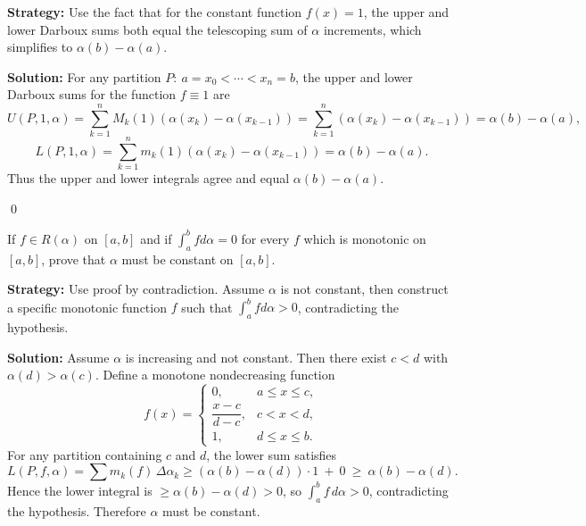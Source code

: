 \noindent\textbf{Strategy:} Use the fact that for the constant function $f(x) = 1$, the upper and lower Darboux sums both equal the telescoping sum of $\alpha$ increments, which simplifies to $\alpha(b) - \alpha(a)$.

\bigskip\noindent\textbf{Solution:}
For any partition $P:\ a=x_0<\cdots<x_n=b$, the upper and lower Darboux sums for the function $f\equiv 1$ are
\[U(P,1,\alpha)=\sum_{k=1}^n M_k(1)(\alpha(x_k)-\alpha(x_{k-1}))=\sum_{k=1}^n (\alpha(x_k)-\alpha(x_{k-1}))=\alpha(b)-\alpha(a),\]
\[L(P,1,\alpha)=\sum_{k=1}^n m_k(1)(\alpha(x_k)-\alpha(x_{k-1}))=\alpha(b)-\alpha(a).\]
Thus the upper and lower integrals agree and equal $\alpha(b)-\alpha(a)$.




\qed
\begin{problembox}
\begin{problemstatement}
If $f \in R(\alpha)$ on $[a, b]$ and if $\int_a^b f d\alpha = 0$ for every $f$ which is monotonic on $[a, b]$, prove that $\alpha$ must be constant on $[a, b]$.
\end{problemstatement}
\end{problembox}

\noindent\textbf{Strategy:} Use proof by contradiction. Assume $\alpha$ is not constant, then construct a specific monotonic function $f$ such that $\int_a^b f d\alpha > 0$, contradicting the hypothesis.

\bigskip\noindent\textbf{Solution:}
Assume $\alpha$ is increasing and not constant. Then there exist $c<d$ with $\alpha(d)>\alpha(c)$. Define a monotone nondecreasing function
\[
f(x)=\begin{cases}
0,& a\le x\le c,\\
\dfrac{x-c}{d-c},& c<x<d,\\
1,& d\le x\le b.
\end{cases}
\]
For any partition containing $c$ and $d$, the lower sum satisfies
\[L(P,f,\alpha)=\sum m_k(f)\,\Delta\alpha_k\ge (\alpha(b)-\alpha(d))\cdot 1\ +\ 0\ \ge\ \alpha(b)-\alpha(d).
\]
Hence the lower integral is $\ge \alpha(b)-\alpha(d)>0$, so $\int_a^b f\,d\alpha>0$, contradicting the hypothesis. Therefore $\alpha$ must be constant.





